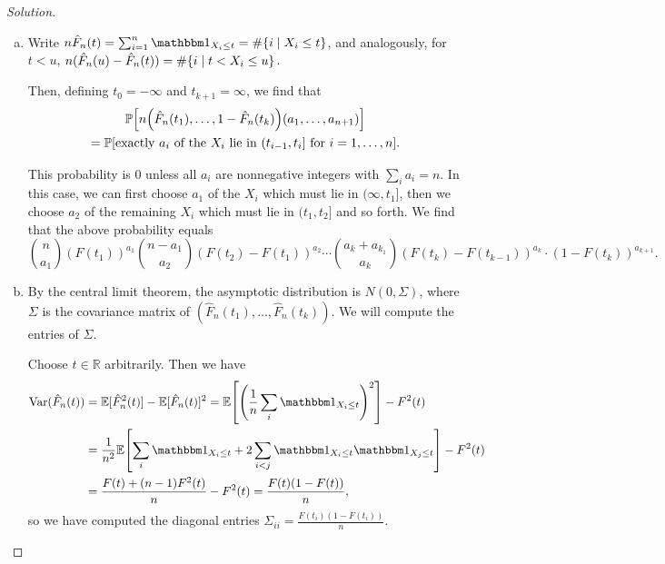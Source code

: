 \documentclass{article}
\theoremstyle{plain}
\theoremstyle{remark}
\newenvironment{solution}{\begin{proof}[Solution]\renewcommand\qedsymbol{}}{\end{proof}}
\newcommand{\Bb}{\mathbb}
\newcommand{\PP}{\Bb P}
\newcommand{\RR}{\Bb R}
\newcommand{\EE}{\Bb E}
\newcommand\ind{\mathbbm 1} %
\DeclareMathOperator{\Var}{Var}
\begin{document}
\begin{solution}
	\begin{enumerate}[(a)] \item
	Write $n \hat F_n(t) = \sum_{i=1}^n \ind_{X_i \leq t} = \# \qty{i \mid X_i \leq t}$, and analogously, for $t < u$, 
	$n (\hat F_n(u) - \hat F_n(t)) = \#\qty{i \mid t < X_i \leq u}$. 
	
	Then, defining $t_0 = -\infty$ and $t_{k+1} = \infty$,  we find that
	\begin{gather*}
	\PP\qty[ n \qty(\hat F_n(t_1), \dotsc, 1 - \hat F_n(t_k)) (a_1, \dotsc, a_{n+1})] \\ = \PP[\text{exactly $a_i$ of the $X_i$ lie in $(t_{i-1}, t_i]$ for $i = 1, \dotsc, n$}].
	\end{gather*}

This probability is 0 unless all $a_i$ are nonnegative integers with $\sum_i a_i = n$. In this case, we can first choose $a_1$ of the $X_i$ which must lie in $(\infty, t_1]$, then we choose $a_2$ of the remaining $X_i$ which must lie in $(t_1, t_2]$ and so forth. We find that the above probability equals
\[
\binom{n}{a_1} (F(t_1))^{a_1} \binom{n - a_1}{a_2} (F(t_2) - F(t_1))^{a_2} \dotsb \binom{a_k + a_{k_1}}{a_k} (F(t_k) - F(t_{k-1}))^{a_k} \cdot (1 - F(t_k))^{a_{k+1}}. 
\]

\item By the central limit theorem, the asymptotic distribution is $N(0, \Sigma)$, where $\Sigma$ is the covariance matrix of $(\hat F_n(t_1), \dotsc, \hat F_n(t_k))$. We will compute the entries of $\Sigma$. 

Choose $t \in \RR$ arbitrarily. Then we have
\begin{align*}
	\Var(\hat F_n(t)) &= \EE[\hat F_n^2(t)] - \EE[\hat F_n(t)]^2 = \EE\qty[\qty(\frac1n\sum_i \ind_{X_i \leq t})^2] - F^2(t) \\
	&= \frac1{n^2}\EE\qty[\sum_i \ind_{X_i \leq t} + 2\sum_{i < j} \ind_{X_i \leq t} \ind_{X_j \leq t}] - F^2(t) \\
	&= \frac{F(t) + (n-1) F^2(t)}{n} - F^2(t) = \frac{F(t)(1 - F(t))}{n},
\end{align*}
so we have computed the diagonal entries $\Sigma_{ii} = \frac{F(t_i)(1 - F(t_i))}{n}$. 


\end{enumerate}
\end{solution}
\end{document}
